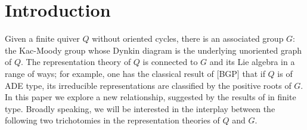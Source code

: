 \documentclass[12pt]{amsart}
\theoremstyle{remark}
\numberwithin{equation}{section}
\begin{document}
\begin{abstract}




\end{abstract}

\maketitle

\section{Introduction}

Given a finite quiver $Q$ without oriented cycles, there is an associated group $G$: the Kac-Moody group whose Dynkin diagram is the underlying unoriented graph of $Q$. The representation theory of $Q$ is connected to $G$ and its Lie algebra in a range of ways; for example, one has the classical result of [BGP] that if $Q$ is of ADE type, its irreducible representations are classified by the positive roots of $G$. In this paper we explore a new relationship, suggested by the results of \cite{YZ08} in finite type. Broadly speaking, we will be interested in the interplay between the following two trichotomies in the representation theories of $Q$ and $G$.
\end{document}
